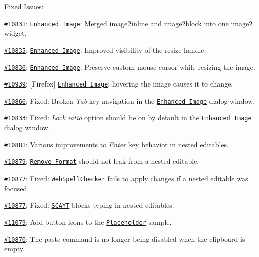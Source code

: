 Fixed Issues\-:
\begin{DoxyItemize}
\item \href{http://dev.ckeditor.com/ticket/10831}{\tt \#10831}\-: \href{http://ckeditor.com/addon/image2}{\tt Enhanced Image}\-: Merged {\ttfamily image2inline} and {\ttfamily image2block} into one {\ttfamily image2} widget.
\item \href{http://dev.ckeditor.com/ticket/10835}{\tt \#10835}\-: \href{http://ckeditor.com/addon/image2}{\tt Enhanced Image}\-: Improved visibility of the resize handle.
\item \href{http://dev.ckeditor.com/ticket/10836}{\tt \#10836}\-: \href{http://ckeditor.com/addon/image2}{\tt Enhanced Image}\-: Preserve custom mouse cursor while resizing the image.
\item \href{http://dev.ckeditor.com/ticket/10939}{\tt \#10939}\-: \mbox{[}Firefox\mbox{]} \href{http://ckeditor.com/addon/image2}{\tt Enhanced Image}\-: hovering the image causes it to change.
\item \href{http://dev.ckeditor.com/ticket/10866}{\tt \#10866}\-: Fixed\-: Broken {\itshape Tab} key navigation in the \href{http://ckeditor.com/addon/image2}{\tt Enhanced Image} dialog window.
\item \href{http://dev.ckeditor.com/ticket/10833}{\tt \#10833}\-: Fixed\-: {\itshape Lock ratio} option should be on by default in the \href{http://ckeditor.com/addon/image2}{\tt Enhanced Image} dialog window.
\item \href{http://dev.ckeditor.com/ticket/10881}{\tt \#10881}\-: Various improvements to {\itshape Enter} key behavior in nested editables.
\item \href{http://dev.ckeditor.com/ticket/10879}{\tt \#10879}\-: \href{http://ckeditor.com/addon/removeformat}{\tt Remove Format} should not leak from a nested editable.
\item \href{http://dev.ckeditor.com/ticket/10877}{\tt \#10877}\-: Fixed\-: \href{http://ckeditor.com/addon/wsc}{\tt Web\-Spell\-Checker} fails to apply changes if a nested editable was focused.
\item \href{http://dev.ckeditor.com/ticket/10877}{\tt \#10877}\-: Fixed\-: \href{http://ckeditor.com/addon/wsc}{\tt S\-C\-A\-Y\-T} blocks typing in nested editables.
\item \href{http://dev.ckeditor.com/ticket/11079}{\tt \#11079}\-: Add button icons to the \href{http://ckeditor.com/addon/placeholder}{\tt Placeholder} sample.
\item \href{http://dev.ckeditor.com/ticket/10870}{\tt \#10870}\-: The {\ttfamily paste} command is no longer being disabled when the clipboard is empty.

\end{DoxyItemize}
